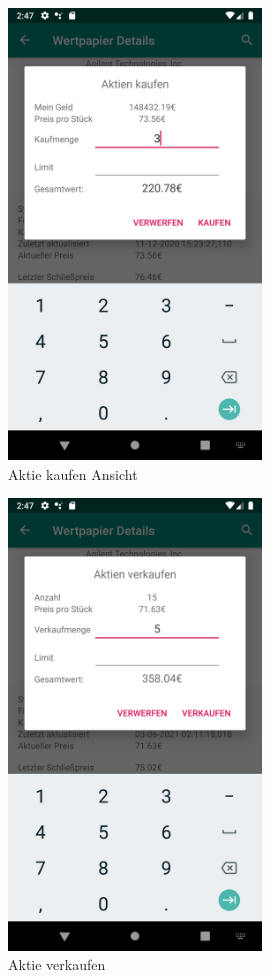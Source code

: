 \documentclass[10pt]{scrartcl}
\begin{document}
\begin{figure}[H]
	\centering
	\includegraphics[width=0.6\textwidth]{Bilder/Applikation/AktieKaufen.png}
	\caption{Aktie kaufen Ansicht}
\end{figure}

\begin{figure}[H]
	\centering
	\includegraphics[width=0.6\textwidth]{Bilder/Applikation/AktieVerkaufen.png}
	\caption{Aktie verkaufen}
\end{figure}
\end{document}
